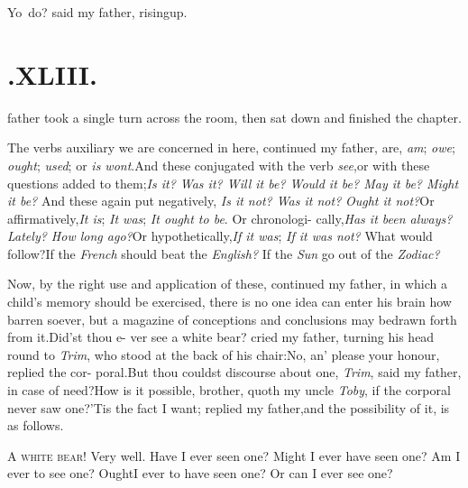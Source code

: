 \documentclass{article}
\begin{document}
\tsh  Yo\sic\ do? said my father,
rising\break up.

\section{.\enspace  XLIII.}

 father took a single turn across
the room, then sat down and finished the chapter.

The verbs auxiliary we are concerned in here, continued my
father, are, \textit{am};
\textit{owe}; \textit{ought}; \textit{used}; or
\textit{is wont}.\tsk And these 
conjugated with the verb
\textit{see},\tsk or with these questions added to
them;\tsk \textit{Is it? Was it? Will it
be? Would it be? May\break 
it be? Might it be?} And these again\break
put negatively, \textit{Is it not? Was it not?}\break
\textit{Ought it not?}\tsk Or affirmatively,\tsk \textit{It is};\break
\textit{It was}; \textit{It ought to be}. Or chronologi-\break
cally,\tsk \textit{Has it been always? Lately?\break
How long ago?}\tsk Or hypothetically,\tsk \textit{If\break
it was}; \textit{If it was not?} What would\break
follow?\tsh If the \textit{French} should beat\break
the \textit{English?} If the \textit{Sun} go out of the\break
\textit{Zodiac?}

Now, by the right use and application of these, continued my
father, in which a child’s memory should be exercised, there
is no one idea can enter his brain how barren soever, but a
magazine of conceptions and conclusions may be\break drawn forth from
it.\tsh Did’st thou e-\break 
ver see a white bear? cried my father,\break
turning his head round to \textit{Trim}, who\break 
stood at the back of his chair:\tsk No,\break
an’ please your honour, replied the cor-\break
poral.\tsh But thou couldst discourse\break
about one, \textit{Trim}, said my father, in\break
case of need?\tsh How is it possible,\break
brother, quoth my uncle \textit{Toby}, if the\break
corporal never saw one?\tsh ’Tis the\break
fact I want; replied my father,\tsk and\break
the possibility of it, is as follows.

A \textsc{white bear}! Very well.  Have\break
I ever seen one? Might I ever have seen
one? Am I ever to see one? Ought\break I ever
to have seen one? Or can I ever see one?
\end{document}
